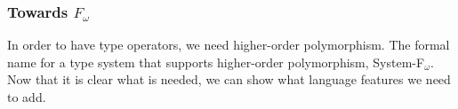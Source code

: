   \subsubsection*{Towards $F_\omega$}
  In order to have type operators, we need higher-order polymorphism.
  The formal name for a type system that supports higher-order polymorphism, System-F$_\omega$.\cite[Chapter~30]{Pierce02}
  Now that it is clear what is needed, we can show what language features we need to add.
  
  
